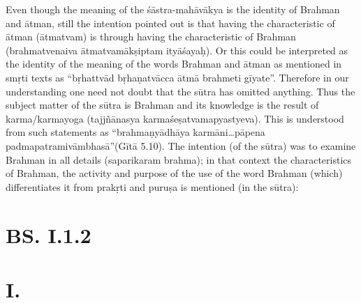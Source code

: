 Even though the meaning of the śāstra-mahāvākya is the identity of Brahman and ātman, still the intention pointed out is that having the  characteristic of ātman (ātmatvam) is through having the characteristic of Brahman (brahmatvenaiva ātmatvamākṣiptam ityāśayaḥ).  Or this could be interpreted as the identity of the meaning of the words Brahman and ātman as mentioned in smṛti texts as “bṛhattvād bṛhaṇat\-vācca ātmā brahmeti gīyate”. Therefore in our understanding one need not doubt that the sūtra has omitted anything. Thus the subject matter of the sūtra is Brahman and its knowledge is the result of karma/karma\-yoga (tajjñānasya karmaśeṣatvamapyastyeva). This is understood from such statements as “brahmaṇyādhāya karmāni…pāpena padmapatra\-mivāmbhasā”(Gītā 5.10). The intention (of the sūtra) was to examine Brahman in all details (saparikaram brahma); in that context the characteristics of Brahman, the activity and purpose of the use of the word Brahman (which) differentiates it from prakṛti and puruṣa is mentioned (in the sūtra):

\section*{BS. I.1.2}

\section*{ I.}


